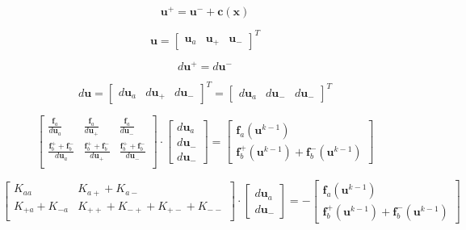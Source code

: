 \documentclass[preprint]{elsarticle}
\begin{document}
\begin{equation}
\bm{u}^+ = \bm{u}^- + \bm{c}(\bm{x}) 
\end{equation}

\begin{equation}
\bm{u} = \begin{bmatrix}\bm{u}_a & \bm{u}_+ & \bm{u}_-\end{bmatrix}^T
\end{equation}

\begin{equation}
d\bm{u}^+ = d\bm{u}^-
\end{equation}

\begin{equation}
d\bm{u} = \begin{bmatrix}d\bm{u}_a & d\bm{u}_+ & d\bm{u}_-\end{bmatrix}^T = \begin{bmatrix}d\bm{u}_a & d\bm{u}_- & d\bm{u}_-\end{bmatrix}^T
\end{equation}

\begin{equation}
\begin{bmatrix}
\frac{\bm{f}_a}{d\bm{u}_a} & \frac{\bm{f}_a}{d\bm{u}_+} & \frac{\bm{f}_a}{d\bm{u}_-}\\
\frac{\bm{f}_b^+ + \bm{f}_b^-}{d\bm{u}_a} & \frac{\bm{f}_b^+ + \bm{f}_b^-}{d\bm{u}_+} & \frac{\bm{f}_b^+ + \bm{f}_b^-}{d\bm{u}_-}\\
\end{bmatrix}
\cdot
\begin{bmatrix}d\bm{u}_a \\ d\bm{u}_- \\ d\bm{u}_-\end{bmatrix}
=
\begin{bmatrix}\bm{f}_a(\bm{u}^{k-1}) \\ \bm{f}_b^+(\bm{u}^{k-1}) + \bm{f}_b^-(\bm{u}^{k-1}) \end{bmatrix}
\end{equation}

\begin{equation}
\begin{bmatrix}
K_{aa}          & K_{a+} + K_{a-} \\
K_{+a} + K_{-a} & K_{++} + K_{-+}  + K_{+-} + K_{--} \\
\end{bmatrix}
\cdot
\begin{bmatrix}d\bm{u}_a \\ d\bm{u}_- \end{bmatrix}
=
-\begin{bmatrix}\bm{f}_a(\bm{u}^{k-1}) \\ \bm{f}_b^+(\bm{u}^{k-1}) + \bm{f}_b^-(\bm{u}^{k-1}) \end{bmatrix}
\end{equation}
\end{document}
